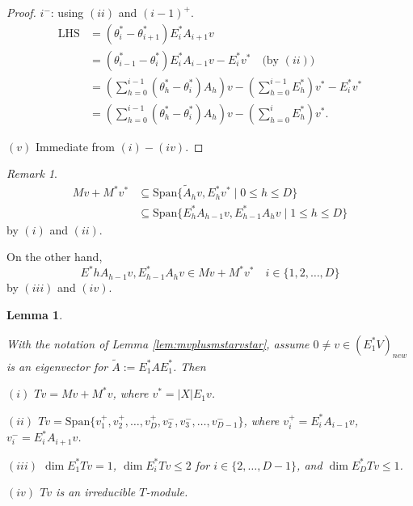 \documentclass[
]{book}
\newtheorem{lemma}{Lemma}[chapter]
\theoremstyle{definition}
\theoremstyle{definition}
\theoremstyle{definition}
\theoremstyle{definition}
\theoremstyle{remark}
\newtheorem*{remark}{Remark}
\begin{document}
\begin{proof}
\(i^-\): using \((ii)\) and \((i-1)^+\).
\begin{align}
\mathrm{LHS} & = (\theta^*_i - \theta^*_{i+1})E^*_{i}A_{i+1}v \\
& = (\theta^*_{i-1}-\theta^*_{i})E^*_{i}A_{i-1}v - E^*_iv^* \quad \text{(by $(ii)$)}\\
& = \left(\sum_{h=0}^{i-1}(\theta^*_h-\theta^*_{i})A_h\right)v - \left(\sum_{h=0}^{i-1} E^*_h\right)v^* - E^*_iv^*\\ 
& = \left(\sum_{h=0}^{i-1} (\theta^*_h-\theta^*_{i})A_h\right)v - \left(\sum_{h=0}^i E^*_h\right)v^*.
\end{align}

\((v)\) Immediate from \((i)-(iv)\).

\end{proof}

\begin{remark}
\begin{align}
Mv + M^*v^* & \subseteq \mathrm{Span}\{\tilde{A}_hv, E^*_hv^*\mid 0\leq h\leq D\}\\
& \subseteq \mathrm{Span}\{E^*_hA_{h-1}v, E^*_{h-1}A_hv\mid 1\leq h\leq D\}
\end{align}
by \((i)\) and \((ii)\).

On the other hand,
\[E^*hA_{h-1}v, E^*_{h-1}A_hv\in Mv + M^*v^* \quad i\in \{1, 2, \ldots, D\}\]
by \((iii)\) and \((iv)\).
\end{remark}

\begin{lemma}
\protect\hypertarget{lem:tv}{}\label{lem:tv}

With the notation of Lemma \ref{lem:mvplusmstarvstar}, assume \(0\neq v\in (E^*_1V)_{new}\) is an eigenvector for \(\tilde{A}:=E^*_1AE^*_1\). Then

\((i)\) \(Tv = Mv + M^*v\), where \(v^* = |X|E_1v\).

\((ii)\) \(Tv = \mathrm{Span}\{v^+_1, v^+_2, \ldots, v^+_D, v^-_2, v^-_3, \ldots, v^-_{D-1}\}\), where \(v^+_i = E^*_iA_{i-1}v\), \(v^-_i = E^*_iA_{i+1}v\).

\((iii)\) \(\dim E^*_1Tv = 1\), \(\dim E^*_iTv \leq 2\) for \(i\in \{2, \ldots, D-1\}\), and \(\dim E^*_DTv \leq 1\).

\((iv)\) \(Tv\) is an irreducible \(T\)-module.

\end{lemma}
\end{document}
